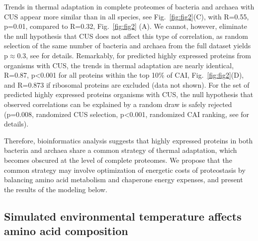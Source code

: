 \documentclass[10pt,letterpaper]{article}
\begin{document}

Trends in thermal adaptation in complete proteomes of bacteria and archaea with CUS appear more similar than in all species, see Fig.~\ref{fig:fig2}(C), with R=0.55, p=0.01, compared to R=0.32, Fig.~\ref{fig:fig2} (A). We cannot, however, eliminate the null hypothesis that CUS does not affect this type of correlation, as  random selection of the same number of bacteria and archaea from the full dataset yields p$\approx$0.3, see  for details. Remarkably, for predicted highly expressed proteins from organisms with CUS, the trends in thermal adaptation are nearly identical, R=0.87, p\textless 0.001 for all proteins within the top 10\% of CAI, Fig.~\ref{fig:fig2}(D), and R=0.873 if ribosomal proteins are excluded (data not shown). For the set of predicted highly expressed proteins organisms with CUS, the null hypothesis that observed correlations can be explained by a random draw is safely rejected (p=0.008, randomized CUS selection,  p\textless0.001, randomized CAI ranking, see  for details).

Therefore, bioinformatics analysis suggests that highly expressed proteins in both bacteria and archaea share a common strategy of thermal adaptation, which becomes obscured at the level of complete proteomes. We propose that the common strategy may involve optimization of energetic costs of proteostasis by balancing amino acid metabolism and chaperone energy expenses, and present the results of the modeling below. 

\subsection*{Simulated environmental temperature affects amino acid composition}
\end{document}
